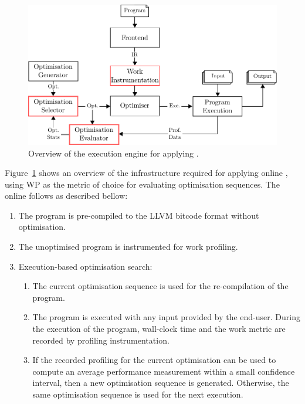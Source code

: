 \begin{figure}[htb]
    \centering
    \includegraphics[width=\linewidth]{figs/infra-diagram}
    \caption{Overview of the execution engine for applying {\itercomp}.}
    \label{fig:infra-diagram}
\end{figure}

Figure~\ref{fig:infra-diagram} shows an overview of the infrastructure required for applying online {\itercomp},
using WP as the metric of choice for evaluating optimisation sequences.
The online {\itercomp} follows as described bellow:
\begin{enumerate}
\item The program is pre-compiled to the LLVM bitcode format without optimisation.
\item The unoptimised program is instrumented for work profiling.
\item Execution-based optimisation search:
 \begin{enumerate}
   \item The current optimisation sequence is used for the re-compilation of the program.
   \item The program is executed with any input provided by the end-user.
         During the execution of the program, wall-clock time and the work metric are recorded by profiling instrumentation.
   \item If the recorded profiling for the current optimisation can be used to compute an average performance measurement within a small confidence interval,
         then a new optimisation sequence is generated.
         Otherwise, the same optimisation sequence is used for the next execution.
 \end{enumerate}
\end{enumerate}

